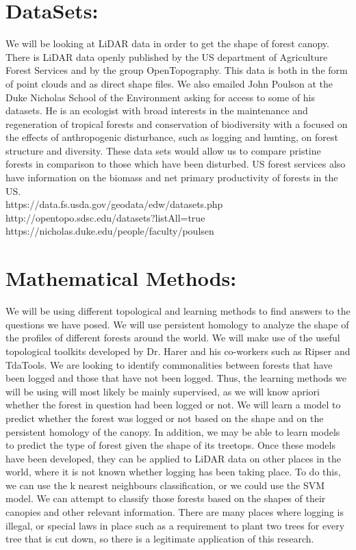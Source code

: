 \documentclass[11pt]{article}
\begin{document}
\section*{DataSets:}
We will be looking at LiDAR data in order to get the shape of forest canopy. There is LiDAR data openly published by the US department of Agriculture Forest Services and by the group OpenTopography. This data is both in the form of point clouds and as direct shape files. We also emailed John Poulson at the Duke Nicholas School of the Environment asking for access to some of his datasets. He is an ecologist with broad interests in the maintenance and regeneration of tropical forests and conservation of biodiversity with a focused on the effects of anthropogenic disturbance, such as logging and hunting, on forest structure and diversity. These data sets would allow us  to compare pristine forests in comparison to those which have been disturbed. US forest services also have information on the biomass and net primary productivity of forests in the US.
\\
https://data.fs.usda.gov/geodata/edw/datasets.php\\
http://opentopo.sdsc.edu/datasets?listAll=true\\
https://nicholas.duke.edu/people/faculty/poulsen



\section*{Mathematical Methods:}
We will be using different topological and learning methods to find answers to the questions we have posed. We will use persistent homology to analyze the shape of the profiles of different forests around the world. We will make use of the useful topological toolkits developed by Dr. Harer and his co-workers such as Ripser and TdaTools. We are looking to identify commonalities between forests that have been logged and those that have not been logged. Thus, the learning methods we will be using will most likely be mainly supervised, as we will know apriori whether the forest in question had been logged or not. We will learn a model to predict whether the forest was logged or not based on the shape and on the persistent homology of the canopy. In addition, we may be able to learn models to predict the type of forest given the shape of its treetops. Once these models have been developed, they can be applied to LiDAR data on other places in the world, where it is not known whether logging has been taking place. To do this, we can use the k nearest neighbours classification, or we could use the SVM model. We can attempt to classify those forests based on the shapes of their canopies and other relevant information. There are many places where logging is illegal, or special laws in place such as a requirement to plant two trees for every tree that is cut down, so there is a legitimate application of this research.

\newpage
\printbibliography
\end{document}
